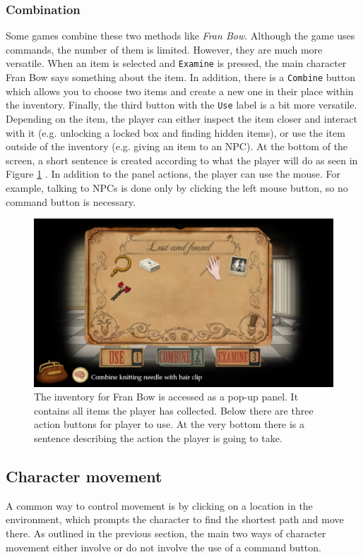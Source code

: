 \subsubsection{Combination}
Some games combine these two methods like \textit{Fran Bow}. Although the game uses commands, the number of them is limited. However, they are much more versatile. When an item is selected and \texttt{Examine} is pressed, the main character Fran Bow says something about the item. In addition, there is a \texttt{Combine} button which allows you to choose two items and create a new one in their place within the inventory. Finally, the third button with the \texttt{Use} label is a bit more versatile. Depending on the item, the player can either inspect the item closer and interact with it (e.g. unlocking a locked box and finding hidden items), or use the item outside of the inventory (e.g. giving an item to an NPC). At the bottom of the screen, a short sentence is created according to what the player will do as seen in Figure \ref{fig:C-FranBow} . 
In addition to the panel actions, the player can use the mouse. For example, talking to NPCs is done only by clicking the left mouse button, so no command button is necessary. 
\begin{figure}[H]
\centering
\includegraphics[width=1.\linewidth]{img/Fran_Bow.png}
\caption{The inventory for Fran Bow is accessed as a pop-up panel. It contains all items the player has collected. Below there are three action buttons for player to use. At the very bottom there is a sentence describing the action the player is going to take.}
\label{fig:C-FranBow}
\end{figure}

\subsection{Character movement}
A common way to control movement is by clicking on a location in the environment, which prompts the character to find the shortest path and move there. As outlined in the previous section, the main two ways of character movement either involve or do not involve the use of a command button.

